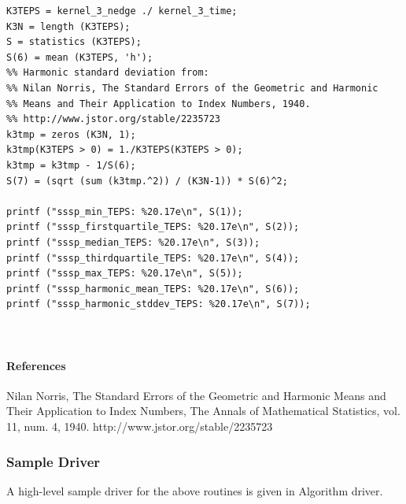 \documentclass{article}
\begin{document}
\begin{lstlisting}
K3TEPS = kernel_3_nedge ./ kernel_3_time;
K3N = length (K3TEPS);
S = statistics (K3TEPS);
S(6) = mean (K3TEPS, 'h');
%% Harmonic standard deviation from:
%% Nilan Norris, The Standard Errors of the Geometric and Harmonic
%% Means and Their Application to Index Numbers, 1940.
%% http://www.jstor.org/stable/2235723
k3tmp = zeros (K3N, 1);
k3tmp(K3TEPS > 0) = 1./K3TEPS(K3TEPS > 0);
k3tmp = k3tmp - 1/S(6);
S(7) = (sqrt (sum (k3tmp.^2)) / (K3N-1)) * S(6)^2;

printf ("sssp_min_TEPS: %20.17e\n", S(1));
printf ("sssp_firstquartile_TEPS: %20.17e\n", S(2));
printf ("sssp_median_TEPS: %20.17e\n", S(3));
printf ("sssp_thirdquartile_TEPS: %20.17e\n", S(4));
printf ("sssp_max_TEPS: %20.17e\n", S(5));
printf ("sssp_harmonic_mean_TEPS: %20.17e\n", S(6));
printf ("sssp_harmonic_stddev_TEPS: %20.17e\n", S(7));



\end{lstlisting}

\paragraph*{References}

Nilan Norris, The Standard Errors of the Geometric and Harmonic Means and Their Application to Index Numbers, The Annals of Mathematical Statistics, vol. 11, num. 4, 1940. http://www.jstor.org/stable/2235723

\subsubsection*{Sample Driver}

A high-level sample driver for the above routines is given in Algorithm driver.
\end{document}
